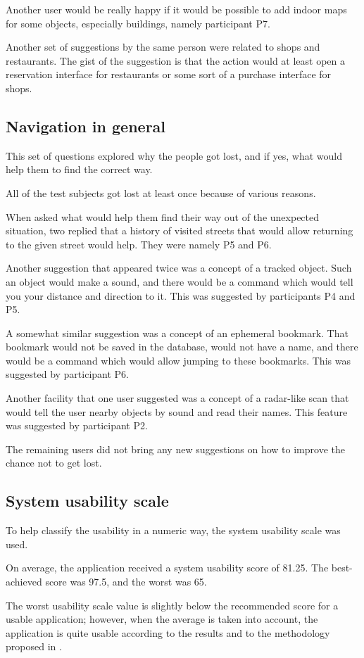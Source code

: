 \documentclass[nolof,digital]{fithesis3}
\begin{document}
Another user would be really happy if it would be possible to add indoor maps for some objects, especially buildings, namely participant P7.

Another set of suggestions by the same person were related to shops and restaurants. The gist of the suggestion is that the action would at least open a reservation interface for restaurants or some sort of a purchase interface for shops.
\subsection{Navigation in general}
This set of questions explored why the people got lost, and if yes, what would help them to find the correct way.

All of the test subjects got lost at least once because of various reasons.

When asked what would help them find their way out of the unexpected situation, two replied that a history of visited streets that would allow returning to the given street would help. They were namely P5 and P6.

Another suggestion that appeared twice was a concept of a tracked object. Such an object would make a sound, and there would be a command which would tell you your distance and direction to it. This was suggested by participants P4 and P5.

A somewhat similar suggestion was a concept of an ephemeral bookmark. That bookmark would not be saved in the database, would not have a name, and there would be a command which would allow jumping to these bookmarks. This was suggested by participant P6.

Another facility that one user suggested was a concept of a radar-like scan that would tell the user nearby objects by sound and read their names. This feature was suggested by participant P2.

The remaining users did not bring any new suggestions on how to improve the chance not to get lost.
\subsection{System usability scale}
To help classify the usability in a numeric way, the system usability scale was used.

On average, the application received a system usability score of 81.25. The best-achieved score was 97.5, and the worst was 65.

The worst usability scale value is slightly below the recommended score for a usable application; however, when the average is taken into account, the application is quite usable according to the results and to the methodology proposed in \parencite{SauroJeff2012Qtue}.
\end{document}
